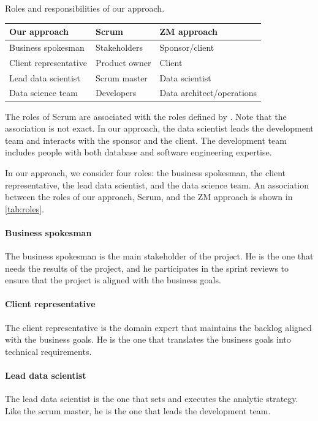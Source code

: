 \begin{tablebox}[label=tab:roles]{Roles and responsibilities of our approach.}
  \centering
  \begin{tabular}{llp{2.5cm}}
    \toprule
    \textbf{Our approach} & \textbf{Scrum} & \textbf{ZM approach} \\
    \midrule
    Business spokesman & Stakeholders & Sponsor/client \\
    Client representative & Product owner & Client \\
    Lead data scientist & Scrum master & Data scientist \\
    Data science team & Developers & Data architect/operations \\
    \bottomrule
  \end{tabular}
  \tcblower
  The roles of Scrum are associated with the roles defined by \textcite{Zumel2019}.
  Note that the association is not exact.
  In our approach, the data scientist leads the development team and interacts with the sponsor
  and the client.  The development team includes people with both database and software
  engineering expertise.
\end{tablebox}

In our approach, we consider four roles: the business spokesman, the client representative,
the lead data scientist, and the data science team.  An association between the roles of
our approach, Scrum, and the ZM approach is shown in \cref{tab:roles}.


\paragraph{Business spokesman}  The business spokesman is the main stakeholder of the project.
He is the one that needs the results of the project, and he participates in the sprint
reviews to ensure that the project is aligned with the business goals.

\paragraph{Client representative}  The client representative is the domain expert that
maintains the backlog aligned with the business goals.  He is the one that translates the
business goals into technical requirements.

\paragraph{Lead data scientist}  The lead data scientist is the one that sets and executes
the analytic strategy.  Like the scrum master, he is the one that leads the development
team.

